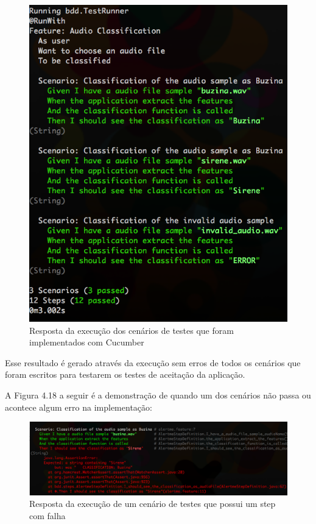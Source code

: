 \begin{figure}[H]
	\centering
	\captionsetup{justification=centering,margin=2cm}
	\includegraphics[scale=0.65]{capitulos/validacao/figuras/execucaoDoCucumberEtudoVerde.eps}
	\caption{Resposta da execução dos cenários de testes que foram implementados com Cucumber}
	\label{fig:result-engajamento}
\end{figure}

Esse resultado é gerado através da execução sem erros de todos os cenários que foram escritos para testarem os testes de aceitação da aplicação.


A Figura 4.18 a seguir é a demonstração de quando um dos cenários não passa ou acontece algum erro na implementação:

\begin{figure}[H]
	\centering
	\captionsetup{justification=centering,margin=2cm}
	\includegraphics[scale=0.65]{capitulos/validacao/figuras/execucaoDoCucumberComUmErro.eps}
	\caption{Resposta da execução de um cenário de testes que possui um step com falha}
	\label{fig:result-engajamento}
\end{figure}

